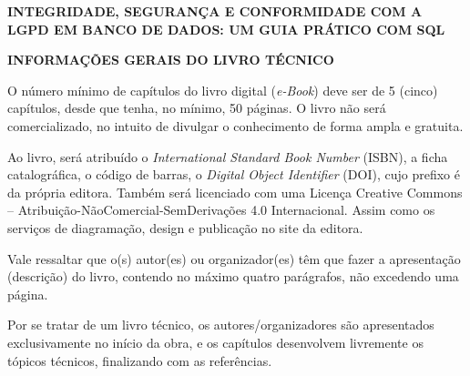 \documentclass[12pt,a4paper]{article}
\begin{document}

\begin{center}
\vspace*{2cm}

\textbf{\fontsize{16}{18}\selectfont INTEGRIDADE, SEGURANÇA E CONFORMIDADE COM A LGPD EM BANCO DE DADOS: UM GUIA PRÁTICO COM SQL}

\end{center}

\vspace{2.5em}


\begin{center}
\textbf{\fontsize{12}{14}\selectfont INFORMAÇÕES GERAIS DO LIVRO TÉCNICO}
\end{center}

\vspace{1.2em}

O número mínimo de capítulos do livro digital (\textit{e-Book}) deve ser de 5 (cinco) capítulos, desde que tenha, no mínimo, 50 páginas. O livro não será comercializado, no intuito de divulgar o conhecimento de forma ampla e gratuita.

Ao livro, será atribuído o \textit{International Standard Book Number} (ISBN), a ficha catalográfica, o código de barras, o \textit{Digital Object Identifier} (DOI), cujo prefixo é da própria editora. Também será licenciado com uma Licença Creative Commons -- Atribuição-NãoComercial-SemDerivações 4.0 Internacional. Assim como os serviços de diagramação, design e publicação no site da editora.

Vale ressaltar que o(s) autor(es) ou organizador(es) têm que fazer a apresentação (descrição) do livro, contendo no máximo quatro parágrafos, não excedendo uma página.

Por se tratar de um livro técnico, os autores/organizadores são apresentados exclusivamente no início da obra, e os capítulos desenvolvem livremente os tópicos técnicos, finalizando com as referências.

\vspace{2.5em}
\end{document}
